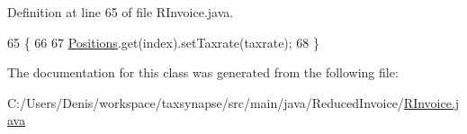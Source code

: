 Definition at line 65 of file R\+Invoice.\+java.


\begin{DoxyCode}
65                                                            \{
66 
67         \hyperlink{class_reduced_invoice_1_1_a_invoice_a5b51f1865386bd021580507c7133f69a}{Positions}.get(index).setTaxrate(taxrate);
68     \}
\end{DoxyCode}


The documentation for this class was generated from the following file\+:\begin{DoxyCompactItemize}
\item 
C\+:/\+Users/\+Denis/workspace/taxsynapse/src/main/java/\+Reduced\+Invoice/\hyperlink{_r_invoice_8java}{R\+Invoice.\+java}\end{DoxyCompactItemize}
